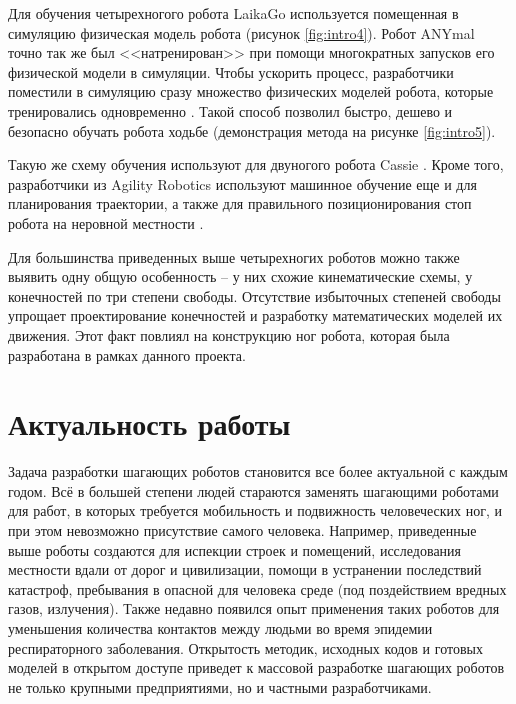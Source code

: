 Для обучения четырехногого робота LaikaGo используется помещенная в симуляцию физическая модель робота \cite{LaikaGo2019} (рисунок \ref{fig:intro4}). Робот ANYmal точно так же был <<натренирован>> при помощи многократных запусков его физической модели в симуляции. Чтобы ускорить процесс, разработчики поместили в симуляцию сразу множество физических моделей робота, которые тренировались одновременно \cite{RoboSysLab2019}. Такой способ позволил быстро, дешево и безопасно обучать робота ходьбе (демонстрация метода на рисунке \ref{fig:intro5}). 

Такую же схему обучения используют для двуногого робота Cassie \cite{AgilityRobo2018}. Кроме того, разработчики из Agility Robotics используют машинное обучение еще и для планирования траектории, а также для правильного позиционирования стоп робота на неровной местности \cite{Agility2020}.

Для большинства приведенных выше четырехногих роботов можно также выявить одну общую особенность -- у них схожие кинематические схемы, у конечностей по три степени свободы. Отсутствие избыточных степеней свободы упрощает проектирование конечностей и разработку математических моделей их движения. Этот факт повлиял на конструкцию ног робота, которая была разработана в рамках данного проекта.

\section*{Актуальность работы}

Задача разработки шагающих роботов становится все более актуальной с каждым годом. Всё в большей степени людей стараются заменять шагающими роботами для работ, в которых требуется мобильность и подвижность человеческих ног, и при этом невозможно присутствие самого человека. Например, приведенные выше роботы создаются для испекции строек и помещений, исследования местности вдали от дорог и цивилизации, помощи в устранении последствий катастроф, пребывания в опасной для человека среде (под поздействием вредных газов, излучения). Также недавно появился опыт применения таких роботов для уменьшения количества контактов между людьми во время эпидемии респираторного заболевания. Открытость методик, исходных кодов и готовых моделей в открытом доступе приведет к массовой разработке шагающих роботов не только крупными предприятиями, но и частными разработчиками. 

